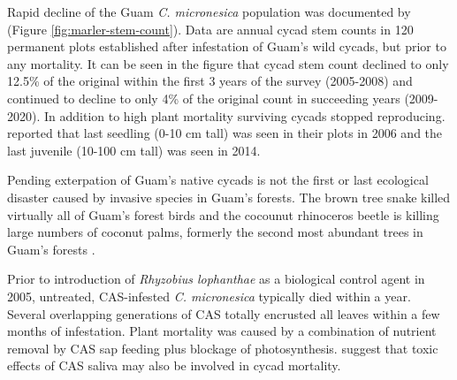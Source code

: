\documentclass[12pt,letterpaper,english,bibliography=totocnumbered, abstract=on]{scrartcl}
\begin{document}
Rapid decline of the Guam \textit{C. micronesica} population was documented by 
\cite{marlerLongitudeForestFragmentation2020} (Figure \ref{fig:marler-stem-count}). Data are annual cycad stem counts in 120 permanent plots established after infestation of Guam's wild cycads, but prior to any mortality. It can be seen in the figure that cycad stem count declined to only 12.5\% of the original within the first 3 years of the survey (2005-2008) and continued to decline to only 4\% of the original count in succeeding years (2009-2020). In addition to high plant mortality surviving cycads stopped reproducing. \cite{marlerLongitudeForestFragmentation2020} reported that last seedling (0-10 cm tall) was seen in their plots in 2006 and the last juvenile (10-100 cm tall) was seen in 2014.

Pending exterpation of Guam's native cycads is not the first or last ecological disaster caused by invasive species in Guam's forests. The brown tree snake killed virtually all of Guam's forest birds and the cocounut rhinoceros beetle is killing large numbers of coconut palms, formerly the second most abundant trees in Guam's forests \parencite{donnegon_guams_2004}.

Prior to introduction of \textit{Rhyzobius lophanthae} as a biological control agent in 2005, untreated, CAS-infested \textit{C. micronesica} typically died within a year. Several overlapping generations of CAS totally encrusted all leaves within a few months of infestation. Plant mortality was caused by a combination of nutrient removal by CAS sap feeding plus blockage of photosynthesis. \cite{muniappanCycadAulacaspisScale2012} suggest that toxic effects of CAS saliva may also be involved in cycad mortality.
\end{document}

